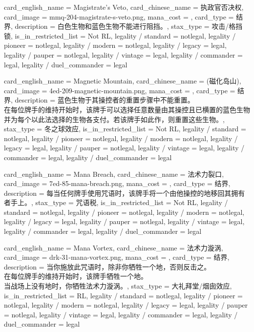 \documentclass[lang = cn, color = black, 10pt]{AllThatStax}
\begin{document}
\card
{
	card_english_name = {Magistrate's Veto},
	card_chinese_name = {执政官否决权},
	card_image = mmq-204-magistrate-s-veto.png,
	mana_cost = ,
	card_type = 结界,
	description = {白色生物和蓝色生物不能进行阻挡。},
	stax_type = 攻击/格挡锁,
	is_in_restricted_list = Not RL,
	legality / standard = notlegal,
	legality / pioneer = notlegal,
	legality / modern = notlegal,
	legality / legacy = legal,
	legality / pauper = notlegal,
	legality / vintage = legal,
	legality / commander = legal,
	legality / duel_commander = legal
}

\card
{
	card_english_name = {Magnetic Mountain},
	card_chinese_name = {(磁化岛山)},
	card_image = 4ed-209-magnetic-mountain.png,
	mana_cost = ,
	card_type = 结界,
	description = {蓝色生物于其操控者的重置步骤中不能重置。\\
在每位牌手的维持开始时，该牌手可以选择任意数量由其操控且已横置的蓝色生物并为每个以此法选择的生物各支付。若该牌手如此作，则重置这些生物。},
	stax_type = 冬之球效应,
	is_in_restricted_list = Not RL,
	legality / standard = notlegal,
	legality / pioneer = notlegal,
	legality / modern = notlegal,
	legality / legacy = legal,
	legality / pauper = notlegal,
	legality / vintage = legal,
	legality / commander = legal,
	legality / duel_commander = legal
}

\card
{
	card_english_name = {Mana Breach},
	card_chinese_name = {法术力裂口},
	card_image = 7ed-85-mana-breach.png,
	mana_cost = ,
	card_type = 结界,
	description = {每当任何牌手使用咒语时，该牌手将一个由他操控的地移回其拥有者手上。},
	stax_type = 咒语税,
	is_in_restricted_list = Not RL,
	legality / standard = notlegal,
	legality / pioneer = notlegal,
	legality / modern = notlegal,
	legality / legacy = legal,
	legality / pauper = notlegal,
	legality / vintage = legal,
	legality / commander = legal,
	legality / duel_commander = legal
}

\card
{
	card_english_name = {Mana Vortex},
	card_chinese_name = {法术力漩涡},
	card_image = drk-31-mana-vortex.png,
	mana_cost = ,
	card_type = 结界,
	description = {当你施放此咒语时，除非你牺牲一个地，否则反击之。\\
在每位牌手的维持开始时，该牌手牺牲一个地。\\
当战场上没有地时，你牺牲法术力漩涡。},
	stax_type = 大礼拜堂/烟囱效应,
	is_in_restricted_list = RL,
	legality / standard = notlegal,
	legality / pioneer = notlegal,
	legality / modern = notlegal,
	legality / legacy = legal,
	legality / pauper = notlegal,
	legality / vintage = legal,
	legality / commander = legal,
	legality / duel_commander = legal
}
\end{document}

